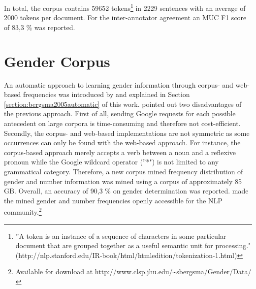 In total, the corpus contains 59652 tokens\footnote{''A token is an instance of a sequence of characters in some particular document that are grouped together as a useful semantic unit for processing." (http://nlp.stanford.edu/IR-book/html/htmledition/tokenization-1.html)} in 2229 sentences with an average of 2000 tokens per document. For the inter-annotator agreement an MUC F1 score \citep{vilain1995model} of 83,3 \% was reported.

\section{Gender Corpus}
An automatic approach to learning gender information through corpus- and web-based frequencies was introduced by \cite{bergsma2005automatic} and explained in Section \ref{section:bergsma2005automatic} of this work. 
\cite{Bergsma:06} pointed out two disadvantages of the previous approach. First of all, sending Google requests for each possible antecedent on large corpora is time-consuming and therefore not cost-efficient. Secondly, the corpus- and web-based implementations are not symmetric as some occurrences can only be found with the web-based approach. For instance, the corpus-based approach merely accepts a verb between a noun and a reflexive pronoun while the Google wildcard operator (''*") is not limited to any grammatical category.
Therefore, a new corpus mined frequency distribution of gender and number information was mined using a corpus of approximately 85 GB. Overall, an accuracy of 90,3 \% on gender determination was reported. \cite{Bergsma:06} made the mined gender and number frequencies openly accessible for the NLP community.\footnote{Available for download at http://www.clsp.jhu.edu/\textasciitilde sbergsma/Gender/Data/}